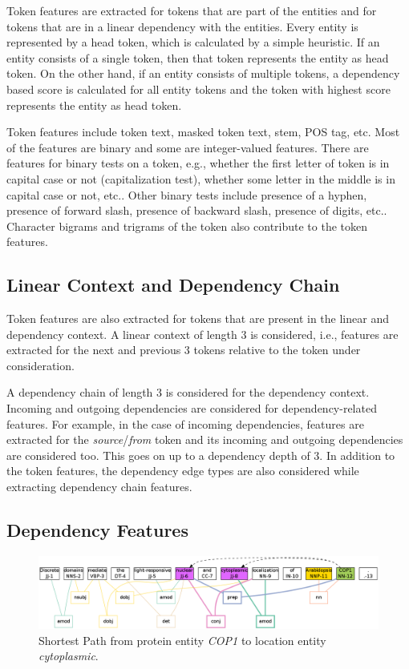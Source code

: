 Token features are extracted for tokens that are part of the entities and for tokens that are in a linear dependency with the entities. Every entity is represented by a head token, which is calculated by a simple heuristic. If an entity consists of a single token, then that token represents the entity as head token. On the other hand, if an entity consists of multiple tokens, a dependency based score is calculated for all entity tokens and the token with highest score represents the entity as head token. %

Token features include token text, masked token text, stem, POS tag, etc. Most of the features are binary and some are integer-valued features. There are features for binary tests on a token, e.g., whether the first letter of token is in capital case or not (capitalization test), whether some letter in the middle is in capital case or not, etc.. Other binary tests include presence of a hyphen, presence of forward slash, presence of backward slash, presence of digits, etc.. Character bigrams and trigrams of the token also contribute to the token features.

\subsection*{Linear Context and Dependency Chain}

Token features are also extracted for tokens that are present in the linear and dependency context. A linear context of length 3 is considered, i.e., features are extracted for the next and previous 3 tokens relative to the token under consideration.

A dependency chain of length 3 is considered for the dependency context. Incoming and outgoing dependencies are considered for dependency-related features. For example, in the case of incoming dependencies, features are extracted for the \emph{source}/\emph{from} token and its incoming and outgoing dependencies are considered too. This goes on up to a dependency depth of 3. In addition to the token features, the dependency edge types are also considered while extracting dependency chain features.

\subsection*{Dependency Features}

\begin{figure}
\centering
\includegraphics[scale=0.3]{figures/ShortestPath.png}
\caption{Shortest Path from protein entity \textit{COP1} to location entity \textit{cytoplasmic}.}\label{fig:shortPath}
\end{figure}

